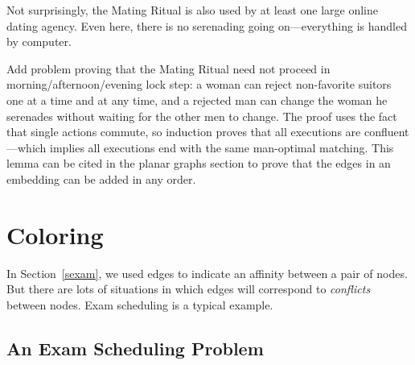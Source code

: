 Not surprisingly, the Mating Ritual is also used by at least one large
online dating agency.  Even here, there is no serenading going
on---everything is handled by computer.

\begin{problems}

\practiceproblems
{}

\classproblems

\homeworkproblems
{}

\examproblems
{}

\begin{editingnotes}
\begin{problem*}
Add problem proving that the Mating Ritual need not proceed in
morning/afternoon/evening lock step: a woman can reject non-favorite
suitors one at a time and at any time, and a rejected man can change
the woman he serenades without waiting for the other men to change.
The proof uses the fact that single actions commute, so induction
proves that all executions are confluent---which implies all
executions end with the same man-optimal matching.  This lemma can be
cited in the planar graphs section to prove that the edges in an
embedding can be added in any order.
\end{problem*}
\end{editingnotes}

\end{problems}


\section{Coloring}\label{sec:coloring}

In Section~\ref{sexam}, we used edges to indicate an affinity between a
pair of nodes.  But there are lots of situations in which edges will
correspond to \emph{conflicts} between nodes.  Exam scheduling is a
typical example.

\subsection{An Exam Scheduling Problem}

